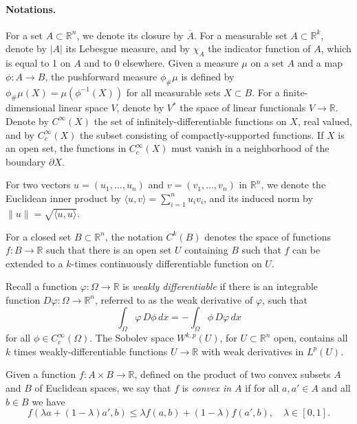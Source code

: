 \documentclass{article}
\newcommand{\R}{\mathbb{R}}
\theoremstyle{definition}
\theoremstyle{remark}
\begin{document}
%
%
%

%
%

\paragraph{Notations.}
For a set $A\subset\R^n$, we denote its closure by $\overline A$. 
For a measurable set $A\subset\R^k$, denote by $|A|$ its Lebesgue measure, and by $\chi_A$ the indicator function of $A$, which is equal to 1 on $A$ and to 0 elsewhere. Given a measure $\mu$ on a set $A$ and a map $\phi\colon A\to B$, the pushforward measure $\phi_\#\mu$ is defined by $\phi_\#\mu(X)=\mu(\phi^{-1}(X))$ for all measurable sets $X\subset B$. For a finite-dimensional linear space $V$, denote by $V^*$ the space of linear functionals $V\to\R$. Denote by $C^\infty(X)$ the set of infinitely-differentiable functions on $X$, real valued, and by $C^\infty_c(X)$ the subset consisting of compactly-supported functions. If $X$ is an open set, the functions in $C^\infty_c(X)$ must vanish in a neighborhood of the boundary $\partial X$.

For two vectors $u=(u_1,\dots,u_n)$ and $v=(v_1,\dots,v_n)$ in $\R^n$, we denote the Euclidean inner product by $\langle u,v\rangle=\sum_{i=1}^nu_iv_i$, and its induced norm by $\|u\|=\sqrt{\langle u,u\rangle}$.

For a closed set $B\subset\R^n$, the notation $C^k(B)$ denotes the space of functions $f\colon B\to\R$ such that there is an open set $U$ containing $B$ such that $f$ can be extended to a $k$-times continuously differentiable function on $U$. 

Recall a function $\varphi\colon\Omega\to\R$ is \emph{weakly differentiable} if there is an integrable function $D\varphi\colon\Omega\to\R^n$, referred to as the weak derivative of $\varphi$, such that
\begin{equation}\label{eq:defweakdiff}
 \int_\Omega \varphi \,D\phi\,dx=-\int_\Omega \phi \, D\varphi\,dx
\end{equation}
for all $\phi\in C_c^\infty(\Omega)$.
The Sobolev space $W^{k,p}(U)$, for $U\subset\R^n$ open, contains all $k$ times weakly-differentiable functions $U\to\R$ with weak derivatives in $L^p(U)$.

Given a function $f\colon A\times B\to\R$, defined on the product of two convex subsets $A$ and $B$ of Euclidean spaces, we say that $f$ is \emph{convex in $A$} if for all $a,a'\in A$ and all $b\in B$ we have
\[f(\lambda a+(1-\lambda)a',b)\leq \lambda f(a,b)+(1-\lambda)f(a',b),\quad \lambda\in [0,1].\]
\end{document}
